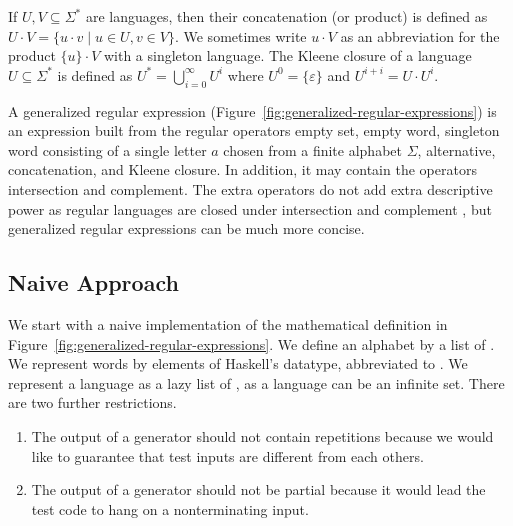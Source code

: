 If $U, V \subseteq \Sigma^*$ are
languages, then their concatenation (or product) is defined as $U\cdot
V = \{ u\cdot v \mid u\in U, v\in V\}$. We sometimes write $u\cdot V$
as an abbreviation for the product $\{u\}\cdot V$ with a singleton
language. The Kleene closure of a
language $U\subseteq \Sigma^*$ is defined as $U^* =
\bigcup_{i=0}^\infty U^i$ where $U^0 = \{\varepsilon\}$ and $U^{i+i} =
U \cdot U^i$. 

A generalized regular expression
(Figure~\ref{fig:generalized-regular-expressions}) is an expression
built from the regular operators empty set, empty word, singleton word
consisting of a single letter $a$ chosen from a finite alphabet
$\Sigma$, alternative, concatenation, and Kleene closure. In addition, it
may contain the operators intersection and complement. The extra
operators do not add extra descriptive power as regular languages are
closed under intersection and complement \cite{DBLP:books/daglib/0011126}, but
generalized regular expressions can be much more concise. 



\subsection{Naive Approach}
\label{sec:naive-approach}

We start with a naive implementation of the mathematical definition in
Figure~\ref{fig:generalized-regular-expressions}. We define an
alphabet by a list of .  We represent words by elements of Haskell's
 datatype, abbreviated to . We
represent a language as a lazy list of , as a language
can be an infinite set. There are two further restrictions.
\begin{enumerate}
\item The output of a generator should not contain repetitions
  because we would like to guarantee that test inputs are different
  from each others.
\item The output of a generator should not be partial because it would
  lead the test code to hang on a nonterminating input.
\end{enumerate}

